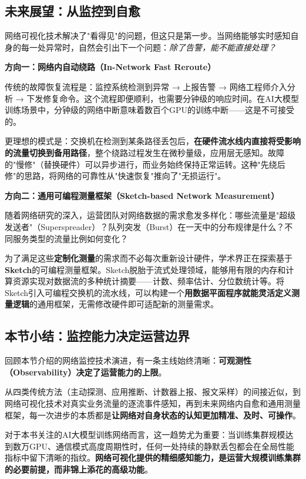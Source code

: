 \subsection{未来展望：从监控到自愈}

网络可视化技术解决了"看得见"的问题，但这只是第一步。当网络能够实时感知自身的每一处异常时，自然会引出下一个问题：\emph{除了告警，能不能直接处理？}

\textbf{方向一：网络内自动绕路（In-Network Fast Reroute）}

传统的故障恢复流程是：监控系统检测到异常 → 上报告警 → 网络工程师介入分析 → 下发修复命令。这个流程即便顺利，也需要分钟级的响应时间。在AI大模型训练场景中，分钟级的网络中断意味着数百个GPU的训练中断——这是不可接受的。

更理想的模式是：交换机在检测到某条路径丢包后，\textbf{在硬件流水线内直接将受影响的流量切换到备用路径}，整个绕路过程发生在微秒量级，应用层无感知。故障的"慢修"（替换硬件）可以异步进行，而业务始终保持正常运转。这种"先绕后修"的思路，将网络的可靠性从"快速恢复"推向了"无损运行"。

\textbf{方向二：通用可编程测量框架（Sketch-based Network Measurement）}

随着网络研究的深入，运营团队对网络数据的需求愈发多样化：哪些流量是"超级发送者"（Superspreader）？队列突发（Burst）在一天中的分布规律是什么？不同服务类型的流量比例如何变化？

为了满足这些\textbf{定制化测量}的需求而不必每次重新设计硬件，学术界正在探索基于\textbf{Sketch}的可编程测量框架。Sketch脱胎于流式处理领域，能够用有限的内存和计算资源实现对数据流的多种统计摘要——计数、频率估计、分位数统计等。将Sketch引入可编程交换机的流水线，可以构建一个\textbf{用数据平面程序就能灵活定义测量逻辑}的通用框架，无需修改硬件即可适配新的测量需求。

\subsection{本节小结：监控能力决定运营边界}

回顾本节介绍的网络监控技术演进，有一条主线始终清晰：\textbf{可观测性（Observability）决定了运营能力的上限}。

从四类传统方法（主动探测、应用推断、计数器上报、报文采样）的间接近似，到网络可视化技术对真实业务流量的逐流事件感知，再到未来网络内自愈和通用测量框架，每一次进步的本质都是\textbf{让网络对自身状态的认知更加精准、及时、可操作}。

对于本书关注的AI大模型训练网络而言，这一趋势尤为重要：当训练集群规模达到数万GPU、通信模式高度周期性时，任何一处持续的静默丢包都会在全局性能指标中留下清晰的指纹。\textbf{网络可视化提供的精细感知能力，是运营大规模训练集群的必要前提，而非锦上添花的高级功能}。

